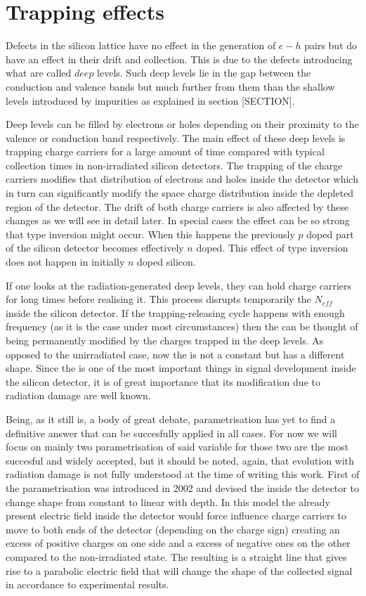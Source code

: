 \section{Trapping effects} %

Defects in the silicon lattice have no effect in the generation of $e-h$ pairs but do have an effect in their drift and collection. This is due to the defects introducing what are called $deep$ levels. Such deep levels lie in the gap between the conduction and valence bands but much further from them than the shallow levels introduced by impurities as explained in section [SECTION].

Deep levels can be filled by electrons or holes depending on their proximity to the valence or conduction band respectively. The main effect of these deep levels is trapping charge carriers for a large amount of time compared with typical collection times in non-irradiated silicon detectors. The trapping of the charge carriers modifies that distribution of electrons and holes inside the detector which in turn can significantly modify the space charge distribution inside the depleted region of the detector. The drift of both charge carriers is also affected by these changes as we will see in detail later. In special cases the effect can be so strong that type inversion might occur. When this happens the previously $p$ doped part of the silicon detector becomes effectively $n$ doped. This effect of type inversion does not happen in initially $n$ doped silicon.

If one looks at the radiation-generated deep levels, they can hold charge carriers for long times before realising it. This process disrupts temporarily the $N_{eff}$ inside the silicon detector. If the trapping-releasing cycle happens with enough frequency (as it is the case under most circumstances) then the \neff can be thought of being permanently modified by the charges trapped in the deep levels. As opposed to the unirradiated case, now the \neff is not a constant but has a different shape. Since the \neff is one of the most important things in signal development inside the silicon detector, it is of great importance that its modification due to radiation damage are well known.

Being, as it still is, a body of great debate, \neff parametrisation has yet to find a definitive answer that can be succesfully applied in all cases. For now we will focus on mainly two parametrisation of said variable for those two are the most succesful and widely accepted, but it should be noted, again, that \neff evolution with radiation damage is not fully understood at the time of writing this work. First of the parametrisation was introduced in 2002 and devised the \neff inside the detector to change shape from constant to linear with depth. In this model the already present electric field inside the detector would force influence charge carriers to move to both ends of the detector (depending on the charge sign) creating an excess of positive charges on one side and a excess of negative ones on the other compared to the non-irradiated state. The resulting \neff is a straight line that gives rise to a parabolic electric field that will change the shape of the collected signal in accordance to experimental results.

